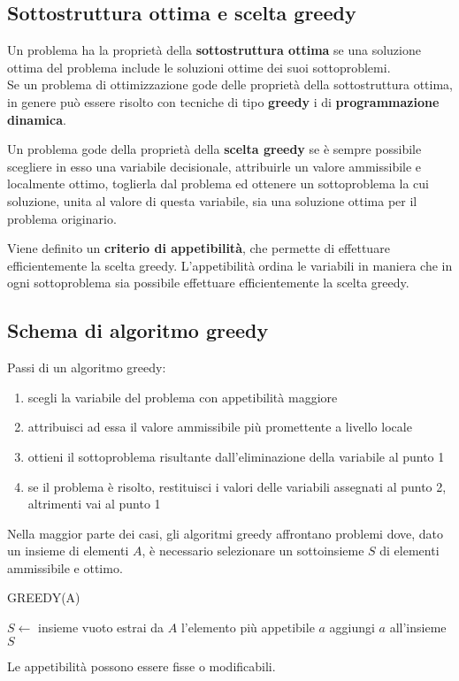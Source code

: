 \documentclass[11pt]{article}
\begin{document}
\subsection{Sottostruttura ottima e scelta greedy}
Un problema ha la proprietà della \textbf{sottostruttura ottima} se una soluzione ottima del problema include le soluzioni 
ottime dei suoi sottoproblemi.\\
Se un problema di ottimizzazione gode delle proprietà della sottostruttura ottima, in genere può essere risolto con tecniche 
di tipo \textbf{greedy} i di \textbf{programmazione dinamica}.

Un problema gode della proprietà della \textbf{scelta greedy} se è sempre possibile scegliere in esso una variabile decisionale, 
attribuirle un valore ammissibile e localmente ottimo, toglierla dal problema ed ottenere un sottoproblema la cui soluzione, 
unita al valore di questa variabile, sia una soluzione ottima per il problema originario.

Viene definito un \textbf{criterio di appetibilità}, che permette di effettuare efficientemente la scelta greedy. L'appetibilità 
ordina le variabili in maniera che in ogni sottoproblema sia possibile effettuare efficientemente la scelta greedy.
\subsection{Schema di algoritmo greedy}
Passi di un algoritmo greedy:
\begin{enumerate}
    \item scegli la variabile del problema con appetibilità maggiore 
    \item attribuisci ad essa il valore ammissibile più promettente a livello locale 
    \item ottieni il sottoproblema risultante dall'eliminazione della variabile al punto 1
    \item se il problema è risolto, restituisci i valori delle variabili assegnati al punto 2, altrimenti vai al punto 1 
\end{enumerate}
Nella maggior parte dei casi, gli algoritmi greedy affrontano problemi dove, dato un insieme di elementi $A$, è necessario 
selezionare un sottoinsieme $S$ di elementi ammissibile e ottimo.
\begin{algorithm}
        \caption{GREEDY(A)}
    \begin{algorithmic}
        \State $S \gets$ insieme vuoto
            \State estrai da $A$ l'elemento più appetibile $a$
                \State aggiungi $a$ all'insieme $S$
            \EndIf 
        \EndWhile
    \end{algorithmic}
\end{algorithm}
Le appetibilità possono essere fisse o modificabili.
\end{document}
